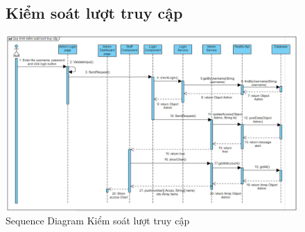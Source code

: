 \documentclass{report}
\begin{document}
\begin{center}
    \begin{figure}[htp]
        \subsection{Kiểm soát lượt truy cập}
        \begin{center}
            \includegraphics[scale = 0.5]{image/kiemsoatluottruycap.png}
        \end{center}
        \caption{Sequence Diagram Kiểm soát lượt truy cập}
    \end{figure}
\end{center}

\pagebreak
\end{document}
